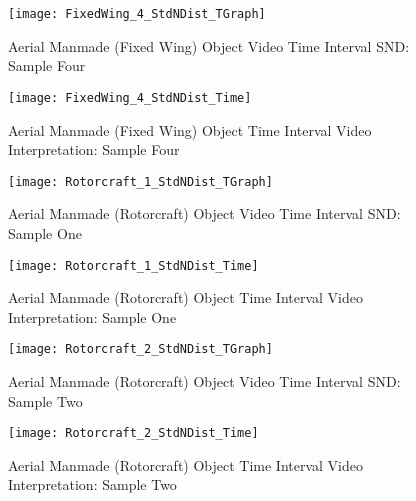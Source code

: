 \newpage  %


\begin{figure}[H]
	\center 
	\texttt{[image: FixedWing\_4\_StdNDist\_TGraph]}
	\captionsetup{list=no}	
	\caption[Aerial Manmade (Fixed Wing) Object Video Time Interval SND: Sample Four]{Aerial Manmade (Fixed Wing) Object Video Time Interval SND: Sample Four}
\end{figure}

\begin{figure}[H]
	\center 
	\texttt{[image: FixedWing\_4\_StdNDist\_Time]}
	\captionsetup{list=no}	
	\caption[Aerial Manmade (Fixed Wing) Object Time Interval Video Interpretation: Sample Four]{Aerial Manmade (Fixed Wing) Object Time Interval Video Interpretation: Sample Four}
\end{figure}

\newpage  %


\begin{figure}[H]
	\center 
	\texttt{[image: Rotorcraft\_1\_StdNDist\_TGraph]}
	\captionsetup{list=no}	
	\caption[Aerial Manmade (Rotorcraft) Object Video Time Interval SND: Sample One]{Aerial Manmade (Rotorcraft) Object Video Time Interval SND: Sample One}
\end{figure}

\begin{figure}[H]
	\center 
	\texttt{[image: Rotorcraft\_1\_StdNDist\_Time]}
	\captionsetup{list=no}	
	\caption[Aerial Manmade (Rotorcraft) Object Time Interval Video Interpretation: Sample One]{Aerial Manmade (Rotorcraft) Object Time Interval Video Interpretation: Sample One}
\end{figure}

\newpage  %


\begin{figure}[H]
	\center 
	\texttt{[image: Rotorcraft\_2\_StdNDist\_TGraph]}
	\captionsetup{list=no}	
	\caption[Aerial Manmade (Rotorcraft) Object Video Time Interval SND: Sample Two]{Aerial Manmade (Rotorcraft) Object Video Time Interval SND: Sample Two}
\end{figure}

\begin{figure}[H]
	\center 
	\texttt{[image: Rotorcraft\_2\_StdNDist\_Time]}
	\captionsetup{list=no}	
	\caption[Aerial Manmade (Rotorcraft) Object Time Interval Video Interpretation: Sample Two]{Aerial Manmade (Rotorcraft) Object Time Interval Video Interpretation: Sample Two}
\end{figure}


